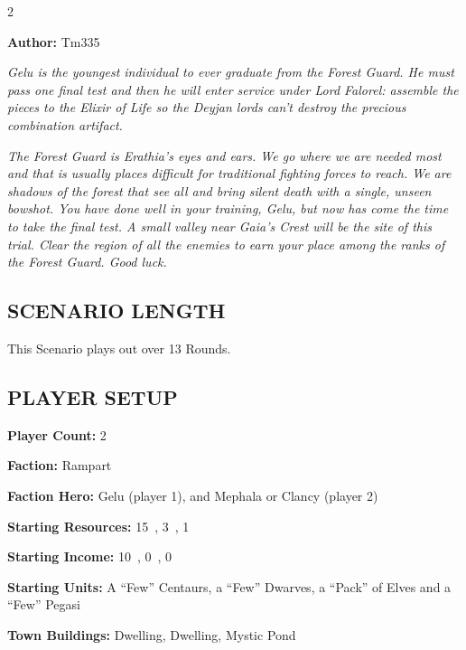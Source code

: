 \cleardoublepage{}

\begin{multicols*}{2}

\textbf{Author:} Tm335

\textit{Gelu is the youngest individual to ever graduate from the Forest Guard.
  He must pass one final test and then he will enter service under Lord Falorel: assemble the pieces to the Elixir of Life so the Deyjan lords can't destroy the precious combination artifact.
}

\textit{The Forest Guard is Erathia’s eyes and ears.
  We go where we are needed most and that is usually places difficult for traditional fighting forces to reach.
  We are shadows of the forest that see all and bring silent death with a single, unseen bowshot.
  You have done well in your training, Gelu, but now has come the time to take the final test.
  A small valley near Gaia's Crest will be the site of this trial.
  Clear the region of all the enemies to earn your place among the ranks of the Forest Guard.
  Good luck.
}

\subsection*{\MakeUppercase{Scenario Length}}

This Scenario plays out over 13 Rounds.

\subsection*{\MakeUppercase{Player Setup}}

\textbf{Player Count:} 2

\textbf{Faction:} Rampart

\textbf{Faction Hero:} Gelu (player 1), and Mephala or Clancy (player 2)

\textbf{Starting Resources:} 15~, 3~, 1~

\textbf{Starting Income:} 10~, 0~, 0~

\textbf{Starting Units:} A ``Few'' Centaurs, a ``Few'' Dwarves, a ``Pack'' of Elves and a ``Few'' Pegasi

\textbf{Town Buildings:}  Dwelling,  Dwelling, Mystic Pond


\end{multicols*}
